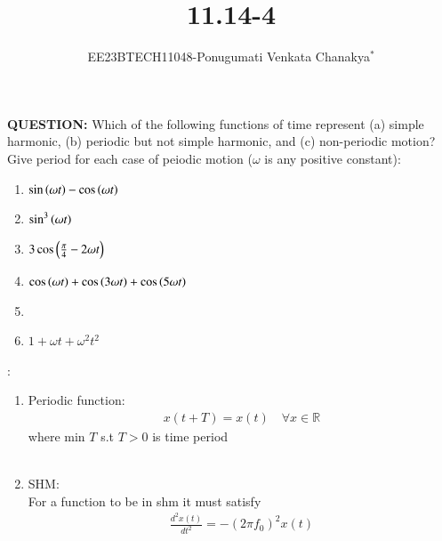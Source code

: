\documentclass[journal,12pt,onecolumn]{IEEEtran}
\theoremstyle{remark}
\begin{document}
 
 \vspace{3cm}
 \title{\textbf{11.14-4}}
 \author{EE23BTECH11048-Ponugumati Venkata Chanakya$^{*}$%
 }
 \maketitle

 \bigskip
 \renewcommand{\thefigure}{\theenumi}
 \renewcommand{\thetable}{\theenumi}
 \textbf{QUESTION:}
 Which of the following functions of time represent (a) simple harmonic, (b) periodic
 but not simple harmonic, and (c) non-periodic motion? Give period for each case of
 peiodic motion ($\omega$ is any positive constant):\\
 \begin{enumerate}
 \item $\sin\left(\omega t\right)-\cos\left(\omega t\right)$\\
 \item $\sin^3\left(\omega t\right)$\\
 \item $3\cos\left(\frac{\pi}{4}- 2\omega t\right)$\\
 \item $\cos\left(\omega t\right)+\cos\left(3\omega t\right)+\cos\left(5\omega t\right)$\\
 \item {}\\
 \item $1+\omega t+\omega^2 t^2$\\
  \end{enumerate}
 \solution:\\
 \begin{enumerate}
  \item Periodic function:
   \begin{align}
x(t+T) = x(t) \quad \forall x \in \mathbb{R}
\end{align}
 where min $T$ s.t $T>0$ is time period\\
 \\
  \item  SHM:\\
    For a function to be in shm it must satisfy 
    \begin{align}
   \frac{d^2 x(t)}{dt^2} = - (2\pi f_0)^2 x(t)\\
      \end{align}
      \end{enumerate}
\end{document}
